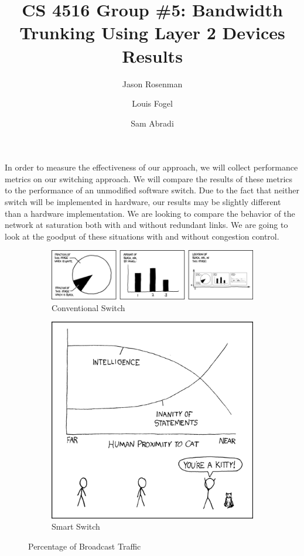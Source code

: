 \documentclass{article}
\title{CS 4516 Group \#5: Bandwidth Trunking Using Layer 2 Devices\\Results}
\author{Jason Rosenman \and Louis Fogel \and Sam Abradi}
\date{}
\begin{document}
\maketitle
In order to measure the effectiveness of our approach, we will collect performance metrics on our switching approach.
We will compare the results of these metrics to the performance of an unmodified software switch.
Due to the fact that neither switch will be implemented in hardware, our results may be slightly different than a hardware implementation.
We are looking to compare the behavior of the network at saturation both with and without redundant links.
We are going to look at the goodput of these situations with and without congestion control.
\begin{figure}[ht]
	\centering
	\begin{subfigure}[b]{0.4\textwidth}
		\centering
		\includegraphics[scale=0.4]{self_description.png}
		\caption{Conventional Switch}
		\label{fig:stdbcast}
	\end{subfigure}
	\hfill
	\begin{subfigure}[b]{0.4\textwidth}
		\centering
		\includegraphics[scale=0.3]{cat_proximity.png}
		\caption{Smart Switch}
		\label{fig:newbcast}
	\end{subfigure}
	\caption{Percentage of Broadcast Traffic}
	\label{fig:bcast}
\end{figure}
\end{document}
